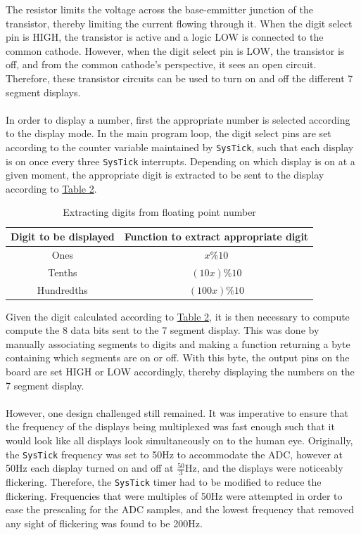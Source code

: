 \documentclass[12pt]{report}
\begin{document}
The resistor limits the voltage across the base-emmitter junction of the transistor, thereby
limiting the current flowing through it. When the digit select pin is HIGH, the transistor is active
and a logic LOW is connected to the common cathode. However, when the digit select pin is LOW, the
transistor is off, and from the common cathode's perspective, it sees an open circuit. Therefore,
these transistor circuits can be used to turn on and off the different 7 segment displays.\\\\
In order to display a number, first the appropriate number is selected according to the display
mode. In the main program loop, the digit select pins are set according to the counter variable
maintained by \texttt{SysTick}, such that each display is on once every three \texttt{SysTick}
interrupts. Depending on which display is on at a given moment, the appropriate digit is extracted
to be sent to the display according to \hyperref[decimalplace]{Table 2}.
\begin{table}[h]\label{decimalplace}
	\caption{Extracting digits from floating point number}
	\begin{center}
		\begin{tabular}{|c|c|}
			\hline
			Digit to be displayed & Function to extract appropriate digit\\\hline
			Ones & $x\%10$\\\hline
			Tenths & $(10x)\%10$\\\hline
			Hundredths & $(100x)\%10$\\\hline
		\end{tabular}
	\end{center}
\end{table}
Given the digit calculated according to \hyperref[decimalplace]{Table 2}, it is then necessary to
compute compute the 8 data bits sent to the 7 segment display. This was done by manually associating
segments to digits and making a function returning a byte containing which segments are on or off.
With this byte, the output pins on the board are set HIGH or LOW accordingly, thereby displaying the
numbers on the 7 segment display.\\\\
However, one design challenged still remained. It was imperative to ensure that the frequency of the
displays being multiplexed was fast enough such that it would look like all displays look
simultaneously on to the human eye. Originally, the \texttt{SysTick} frequency was set to 50Hz to
accommodate the ADC, however at 50Hz each display turned on and off at $\frac{50}{3}$Hz, and the
displays were noticeably flickering. Therefore, the \texttt{SysTick} timer had to be modified to
reduce the flickering. Frequencies that were multiples of 50Hz were attempted in order to ease the
prescaling for the ADC samples, and the lowest frequency that removed any sight of flickering was
found to be 200Hz.
\end{document}
